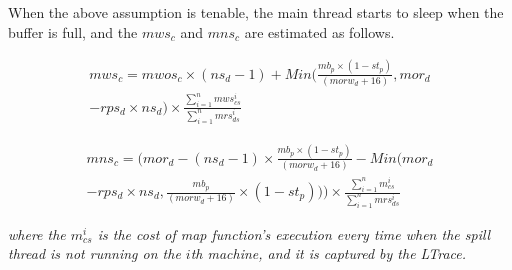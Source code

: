 When the above assumption is tenable, the main thread starts to sleep when the buffer is full, and the $mws_c$ and $mns_c$ are estimated as follows.
\begin{small}
\begin{equation}
\begin{split}
mws_c=mwos_c\times (ns_d-1)+Min(\frac{mb_p\times (1-st_p)}{(morw_d+16)} ,mor_d\\
-rps_d\times ns_d)\times \frac{\sum_{i=1}^nmws_{cs}^i}{\sum_{i=1}^nmrs_{ds}^i} \nonumber
\end{split} 
\end{equation}
\end{small}
\begin{small}
\begin{equation}
\begin{split}
mns_c=(mor_d-(ns_d-1 )\times\frac{mb_p\times (1-st_p)}{(morw_d+16)}-Min(mor_d\\
 - rps_d\times ns_d, \frac{mb_p}{(morw_d+16)} 
\times (1-st_p)))\times \frac{\sum_{i=1}^nm_{cs}^i}{\sum_{i=1}^nmrs_{ds}^i} \nonumber
\end{split}
\end{equation}
\end{small}
\emph{where the $m_{cs}^i$ is the cost of map function's execution every time when the spill thread is not running on the $i$th machine, and it is captured by the LTrace.}

